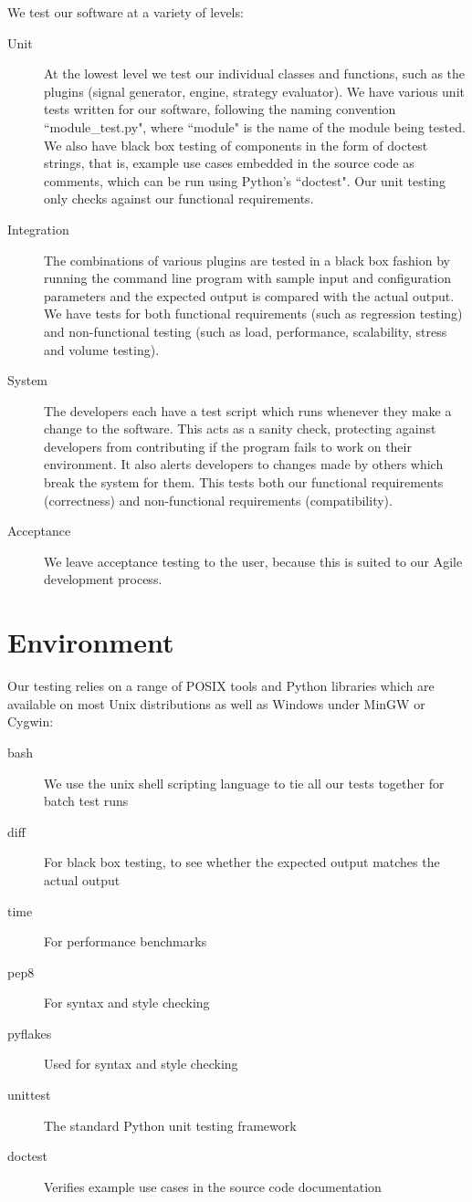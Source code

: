\documentclass{article}
\begin{document}
We test our software at a variety of levels:
\begin{description}
  \item[Unit] At the lowest level we test our individual classes and functions, such as the plugins (signal generator, engine, strategy evaluator). We have various unit tests written for our software, following the naming convention ``module\_test.py", where ``module" is the name of the module being tested. We also have black box testing of components in the form of doctest strings, that is, example use cases embedded in the source code as comments, which can be run using Python's ``doctest". Our unit testing only checks against our functional requirements.
  \item[Integration] The combinations of various plugins are tested in a black box fashion by running the command line program with sample input and configuration parameters and the expected output is compared with the actual output. We have tests for both functional requirements (such as regression testing) and non-functional testing (such as load, performance, scalability, stress and volume testing).
  \item[System] The developers each have a test script which runs whenever they make a change to the software. This acts as a sanity check, protecting against developers from contributing if the program fails to work on their environment. It also alerts developers to changes made by others which break the system for them. This tests both our functional requirements (correctness) and non-functional requirements (compatibility).
  \item[Acceptance] We leave acceptance testing to the user, because this is suited to our Agile development process.
\end{description}

\section{Environment}


Our testing relies on a range of POSIX tools and Python libraries which are available on most Unix distributions as well as Windows under MinGW or Cygwin:
\begin{description}
  \item[bash] We use the unix shell scripting language to tie all our tests together for batch test runs
  \item[diff] For black box testing, to see whether the expected output matches the actual output
  \item[time] For performance benchmarks
  \item[pep8] For syntax and style checking
  \item[pyflakes] Used for syntax and style checking
  \item[unittest] The standard Python unit testing framework
  \item[doctest] Verifies example use cases in the source code documentation
\end{description}
\end{document}
